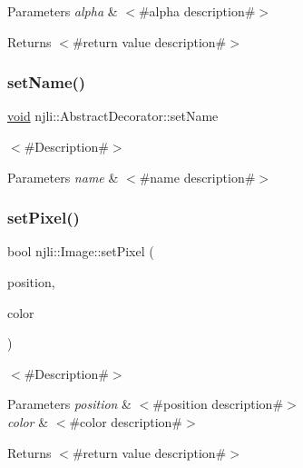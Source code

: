 \begin{DoxyParams}{Parameters}
{\em alpha} & $<$\#alpha description\#$>$\\
\hline
\end{DoxyParams}
\begin{DoxyReturn}{Returns}
$<$\#return value description\#$>$ 
\end{DoxyReturn}
\mbox{\label{classnjli_1_1_image_a087eb5f8d9f51cc476f12f1d10a3cb95}} 
\subsubsection{\texorpdfstring{set\+Name()}{setName()}}
{\footnotesize\ttfamily \mbox{\hyperlink{_thread_8h_af1e856da2e658414cb2456cb6f7ebc66}{void}} njli\+::\+Abstract\+Decorator\+::set\+Name}

$<$\#\+Description\#$>$


\begin{DoxyParams}{Parameters}
{\em name} & $<$\#name description\#$>$ \\
\hline
\end{DoxyParams}
\mbox{\label{classnjli_1_1_image_a9832dbb9ccd17a73581cb8ba3425adac}} 
\subsubsection{\texorpdfstring{set\+Pixel()}{setPixel()}\hspace{0.1cm}{\footnotesize\ttfamily [1/2]}}
{\footnotesize\ttfamily bool njli\+::\+Image\+::set\+Pixel (\begin{DoxyParamCaption}\item[{const bt\+Vector2 \&}]{position,  }\item[{const bt\+Vector4 \&}]{color }\end{DoxyParamCaption})}

$<$\#\+Description\#$>$


\begin{DoxyParams}{Parameters}
{\em position} & $<$\#position description\#$>$ \\
\hline
{\em color} & $<$\#color description\#$>$\\
\hline
\end{DoxyParams}
\begin{DoxyReturn}{Returns}
$<$\#return value description\#$>$ 
\end{DoxyReturn}
\mbox{\label{classnjli_1_1_image_a3e991778945527967f1051433d12bafb}} 
